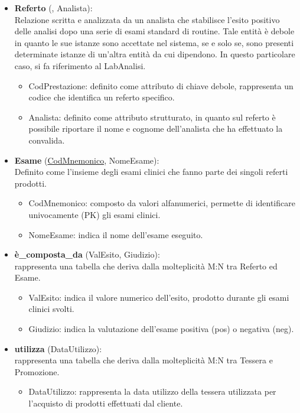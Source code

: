 \documentclass[12pt]{report}
\begin{document}
\begin{itemize}
\begin{itemize}
	\end{itemize}
	
	\item \textbf{Referto} (, Analista):\\
Relazione scritta e analizzata da un analista che stabilisce l’esito positivo delle analisi dopo una serie di esami standard di routine. Tale entità è debole in quanto le sue istanze sono accettate nel sistema, se e solo se, sono presenti determinate istanze di un’altra entità da cui dipendono. In questo particolare caso, si fa riferimento al LabAnalisi.
	\begin{itemize}
		\item CodPrestazione: definito come attributo di chiave debole, rappresenta un codice che identifica un referto specifico.
	    \item Analista: definito come attributo strutturato, in quanto sul referto è possibile riportare il nome e cognome dell’analista che ha effettuato la convalida. 
	\end{itemize}
\item \textbf{Esame} (\underline{CodMnemonico}, NomeEsame):\\
Definito come l’insieme degli esami clinici che fanno parte dei singoli referti prodotti.
	\begin{itemize}
		\item CodMnemonico: composto da valori alfanumerici, permette di identificare univocamente (PK) gli esami clinici. 
	    \item NomeEsame: indica il nome dell'esame eseguito.
	\end{itemize}

\item \textbf{è\_composta\_da} (ValEsito, Giudizio):\\
rappresenta una tabella che deriva dalla molteplicità M:N tra Referto ed Esame.
	\begin{itemize}
		\item ValEsito: indica il valore numerico dell’esito, prodotto durante gli esami clinici svolti.
		\item Giudizio: indica la valutazione dell'esame positiva (pos) o negativa (neg).
	\end{itemize}

\item \textbf{utilizza} (DataUtilizzo):\\
rappresenta una tabella che deriva dalla molteplicità M:N tra Tessera e Promozione.
	\begin{itemize}
		\item DataUtilizzo: rappresenta la data utilizzo della tessera utilizzata per l'acquisto di prodotti effettuati dal cliente.
	\end{itemize}

\end{itemize}
\end{document}
